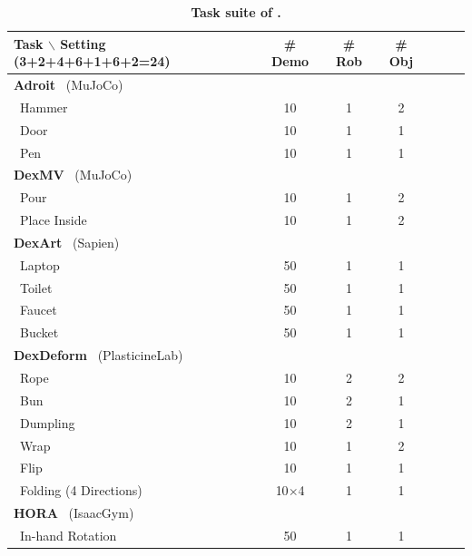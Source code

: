 \begin{table}[t]
\centering
\caption{\textbf{Task suite of \ours.} }
\label{table:tasks}
 \begin{minipage}{.5\linewidth}
\begin{tabular}{lcccccc}
\toprule


 Task $\backslash$ Setting (3+2+4+6+1+6+2=24)  & \# Demo & \# Rob & \# Obj \\
 
\midrule

\textbf{Adroit}~\citep{rajeswaran2017dapg} (MuJoCo) & \\
    ~Hammer & 10 & 1 & 2\\
    ~Door & 10 & 1 & 1\\
    ~Pen & 10 & 1 & 1\\

\midrule    
    
\textbf{DexMV}~\citep{qin2022dexmv} (MuJoCo) & \\
    ~Pour & 10 & 1 & 2\\
    ~Place Inside & 10 & 1 & 2\\

\midrule

\textbf{DexArt}~\citep{bao2023dexart} (Sapien) & \\
    ~Laptop & 50 & 1 & 1\\
    ~Toilet & 50 & 1 & 1\\
    ~Faucet & 50 & 1 & 1\\
    ~Bucket & 50 & 1 & 1\\

\midrule

\textbf{DexDeform}~\citep{li2023dexdeform} (PlasticineLab)\\
~Rope & 10 & 2 & 2\\
~Bun & 10 & 2 & 1 \\
~Dumpling & 10 & 2 & 1\\
~Wrap & 10 & 1 & 2\\
~Flip & 10 & 1 & 1\\
~Folding (4 Directions) & 10$\times$4 & 1 & 1\\

\midrule



\textbf{HORA}~\citep{qi2023hora} (IsaacGym) \\
~In-hand Rotation& 50 & 1 & 1\\


\midrule


\end{tabular}
\end{minipage}
\end{table}
